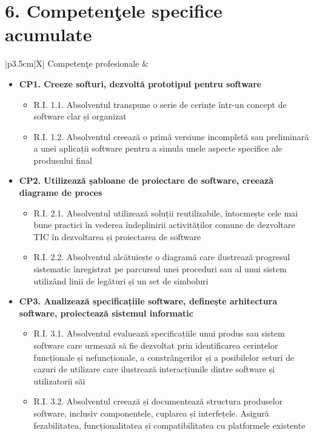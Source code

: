 \documentclass[11pt,a4paper]{article}
\begin{document}
\section*{6. Competenţele specifice acumulate}
\noindent
\begin{xltabular}{\textwidth}{|p{3.5cm}|X|}
\hline
Competenţe profesionale & 
\vspace{-0.3cm}
\begin{itemize}[leftmargin=*]
    \item \textbf{CP1. Creeze softuri, dezvoltă prototipul pentru software}
    \begin{itemize}
            \item R.I. 1.1. Absolventul transpune o serie de cerințe într-un concept de software clar și organizat
            \item R.I. 1.2. Absolventul creează o primă versiune incompletă sau preliminară a unei aplicații software pentru a simula unele aspecte specifice ale produsului final
        \end{itemize}
    \item \textbf{CP2. Utilizează șabloane de proiectare de software, creează diagrame de proces}
    \begin{itemize}
            \item R.I. 2.1. Absolventul utilizează soluții reutilizabile, întocmește cele mai bune practici în vederea îndeplinirii activităților comune de dezvoltare TIC în dezvoltarea și proiectarea de software
            \item R.I. 2.2. Absolventul alcătuiește o diagramă care ilustrează progresul sistematic înregistrat pe parcursul unei proceduri sau al unui sistem utilizând linii de legături și un set de simboluri
        \end{itemize}
    \item \textbf{CP3. Analizează specificațiile software, definește arhitectura software, proiectează sistemul informatic}
    \begin{itemize}
            \item R.I. 3.1. Absolventul evaluează specificațiile unui produs sau sistem software care urmează să fie dezvoltat prin identificarea cerințelor funcționale și nefuncționale, a constrângerilor și a posibilelor seturi de cazuri de utilizare care ilustrează interacțiunile dintre software și utilizatorii săi
            \item R.I. 3.2. Absolventul creează și documentează structura produselor software, inclusiv componentele, cuplarea și interfețele. Asigură fezabilitatea, funcționalitatea și compatibilitatea cu platformele existente

\end{itemize}
\end{itemize}
\end{xltabular}
\end{document}
